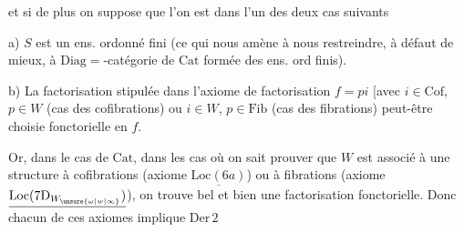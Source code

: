 et si de plus on suppose que l'on est dans l'un des deux cas suivants

a) $S$ est un ens. ordonné fini (ce qui nous amène à nous restreindre, à défaut de mieux, à $\mathrm{Diag}={}$-catégorie de $\mathrm{Cat}$ formée des ens. ord finis).

b) La factorisation stipulée dans l'axiome de factorisation $f=pi$ [avec $i\in\mathrm{Cof}$, $p\in W$ (cas des cofibrations) ou $i\in W$, $p\in\mathrm{Fib}$ (cas des fibrations) peut-être choisie fonctorielle en $f$.

Or, dans le cas de $\mathrm{Cat}$, dans les cas où on sait prouver que $W$ est associé à une structure à cofibrations (axiome $\underline{\mathrm{Loc}(6a)}$) ou à fibrations (axiome $\underline{\mathrm{Loc}(7\mathrm{D}_{W_{\unsure{\omega|w|\infty}}})}$), on trouve bel et bien une factorisation fonctorielle. Donc chacun de ces axiomes\unsure{,}  implique $\mathrm{Der}\,2$

